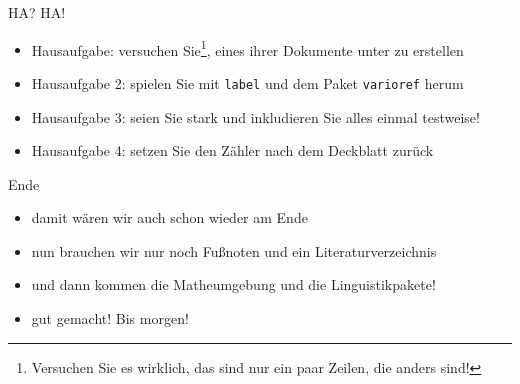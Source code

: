 \begin{frame}[fragile]{HA? HA!}
    \begin{itemize}[<+->]
    \item Hausaufgabe: versuchen Sie\footnote{Versuchen Sie es wirklich, das sind nur ein paar Zeilen, die anders sind!}, eines ihrer Dokumente unter \XeTeX zu erstellen
    \item Hausaufgabe 2: spielen Sie mit \lstinline|label| und dem Paket \lstinline|varioref| herum
    \item Hausaufgabe 3: seien Sie stark und inkludieren Sie alles einmal testweise!
    \item Hausaufgabe 4: setzen Sie den Zähler nach dem Deckblatt zurück
    \end{itemize}
\end{frame}

\begin{frame}[fragile]{Ende}
    \begin{itemize}[<+->]
    \item damit wären wir auch schon wieder am Ende
    \item nun brauchen wir nur noch Fußnoten und ein Literaturverzeichnis
    \item und dann kommen die Matheumgebung und die Linguistikpakete!
    \item gut gemacht! Bis morgen!
    \end{itemize}
\end{frame}

